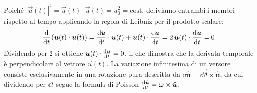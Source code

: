 \begin{dimostrazione}
Poiché $|\vec{u}(t)|^2 = \vec{u}(t)\cdot\vec{u}(t) = u_0^2 = \text{cost}$, deriviamo entrambi i membri rispetto al tempo applicando la regola di Leibniz per il prodotto scalare:
\begin{equation}
    \frac{\mathrm{d} }{\mathrm{d} t}\left(\bm{u}(t)\cdot\bm{u}(t)\right) = \frac{\mathrm{d} \bm{u}}{\mathrm{d} t}\cdot\bm{u}(t) + \bm{u}(t)\cdot\frac{\mathrm{d} \bm{u}}{\mathrm{d} t} = 2\,\bm{u}(t)\cdot\frac{\mathrm{d} \bm{u}}{\mathrm{d} t} = 0
\end{equation}
Dividendo per 2 si ottiene $\bm{u}(t)\cdot\frac{\mathrm{d} \bm{u}}{\mathrm{d} t} = 0$, il che dimostra che la derivata temporale è perpendicolare al vettore $\vec{u}(t)$. La variazione infinitesima di un versore consiste esclusivamente in una rotazione pura descritta da $\dd\hat{\bm{u}} = \dd\vec{\theta} \times \hat{\bm{u}}$, da cui dividendo per $\dd t$ segue la formula di Poisson $\frac{\mathrm{d} \hat{\bm{u}}}{\mathrm{d} t} = \bm{\omega}\times\hat{\bm{u}}$.
\end{dimostrazione}
